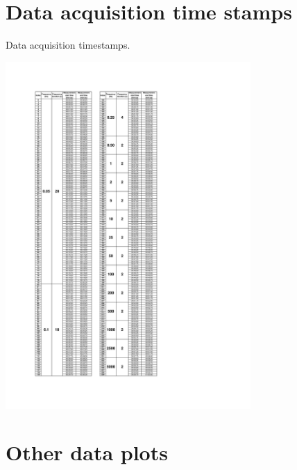 
\appendix


\chapter{Data acquisition time stamps}
\label{app:A}
	
	\begin{table}[!htb]
		
		\centering
		\caption{Data acquisition timestamps.}
		\includegraphics[width=0.7\textwidth]{../figures/timestamps.pdf}
		\label{fig:timestamps}
		
	\end{table}

\clearpage
\chapter{Other data plots}
\label{app:B}

